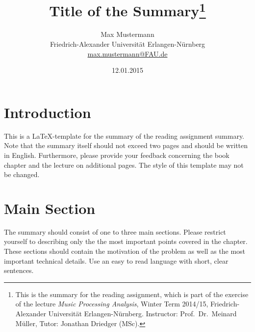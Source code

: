 \documentclass[a4paper, 9pt, twocolumn]{extarticle}
\begin{document}
\date{\normalsize 12.01.2015}

\title{\vspace{-8mm}\textbf{\Large
Title of the Summary\footnote{This is the summary for the reading assignment,
which is part of the exercise of the lecture \emph{Music Processing Analysis}, Winter Term 2014/15,
Friedrich-Alexander Universit\"at Erlangen-N\"urnberg.
Instructor: Prof.\ Dr.\ Meinard M\"uller,
Tutor: Jonathan Driedger (MSc).
}}}

\author{
{
\begin{minipage}{\textwidth}
\center
Max Mustermann\\
\small
Friedrich-Alexander Universit\"at Erlangen-N\"urnberg
\protect\\{} %
\url{max.mustermann@FAU.de}
\end{minipage}
}
}

\maketitle
\thispagestyle{empty}

\section{Introduction}
\label{section:introduction}

This is a \LaTeX-template for the summary of the reading assignment summary. Note that the summary
itself should not exceed two pages and should be written in English.
Furthermore, please provide your feedback concerning the
book chapter and the lecture on additional pages.
The style of this template may not be changed.



\section{Main Section}
\label{section:main}

The summary should consist of one to three main sections.
Please restrict yourself to describing only the the most
important points covered in the chapter. These sections
should contain the motivation of the problem as well as
the most important technical details. Use an easy to read
language with short, clear sentences.
\end{document}
